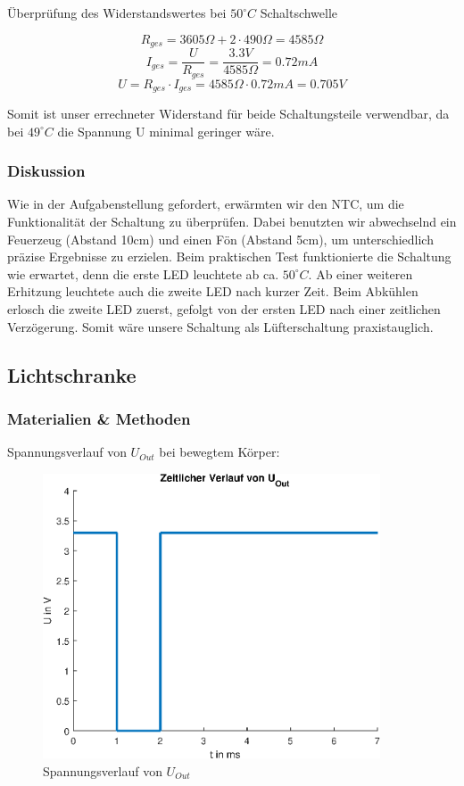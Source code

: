 \noindent
Überprüfung des Widerstandswertes bei $50^{\circ} C$ Schaltschwelle

\[ R_{ges} = 3605 \Omega + 2 \cdot 490 \Omega = 4585 \Omega \]
\[ I_{ges} = \frac{U}{R_{ges}} = \frac{3.3 V}{4585 \Omega} = 0.72 mA \]
\[ U = R_{ges} \cdot I_{ges} = 4585 \Omega \cdot 0.72 mA = 0.705 V \]

\noindent
Somit ist unser errechneter Widerstand für beide Schaltungsteile verwendbar, da bei $49^{\circ} C$ die Spannung U minimal geringer wäre.

\subsubsection{Diskussion}

Wie in der Aufgabenstellung gefordert, erwärmten wir den NTC, um die Funktionalität der Schaltung zu überprüfen. Dabei benutzten wir abwechselnd ein Feuerzeug (Abstand 10cm) und einen Fön (Abstand 5cm), um unterschiedlich präzise Ergebnisse zu erzielen. Beim praktischen Test funktionierte die Schaltung wie erwartet, denn die erste LED leuchtete ab ca. $50^{\circ} C$. Ab einer weiteren Erhitzung leuchtete auch die zweite LED nach kurzer Zeit. Beim Abkühlen erlosch die zweite LED zuerst, gefolgt von der ersten LED nach einer zeitlichen Verzögerung. Somit wäre unsere Schaltung als Lüfterschaltung praxistauglich.


\newpage
\subsection{Lichtschranke}

\subsubsection{Materialien \& Methoden}

Spannungsverlauf von $U_{Out}$ bei bewegtem Körper:

\begin{figure}[htb]
    \includegraphics[width=10cm]{./res/Lichtschranke_Spannungsverlauf}
    \caption{Spannungsverlauf von $U_{Out}$}
    \label{fig:SpannungsverlaufUout}
\end{figure}

